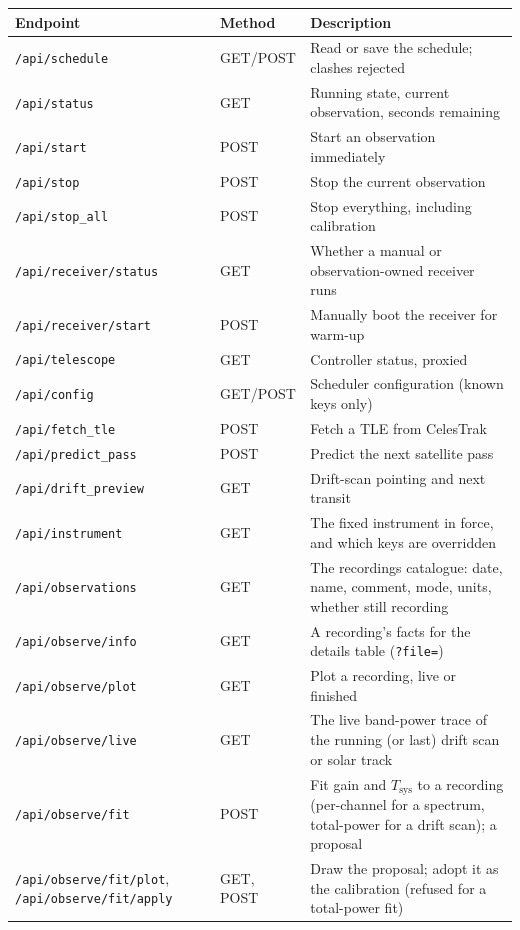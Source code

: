 \documentclass[11pt,a4paper]{article}
\begin{document}
\footnotesize
\begin{longtable}{llp{7.6cm}}
\toprule
\textbf{Endpoint} & \textbf{Method} & \textbf{Description} \\
\midrule
\endhead
\texttt{/api/schedule} & GET/POST & Read or save the schedule; clashes rejected \\
\texttt{/api/status} & GET & Running state, current observation, seconds remaining \\
\texttt{/api/start} & POST & Start an observation immediately \\
\texttt{/api/stop} & POST & Stop the current observation \\
\texttt{/api/stop\_all} & POST & Stop everything, including calibration \\
\texttt{/api/receiver/status} & GET & Whether a manual or observation-owned receiver runs \\
\texttt{/api/receiver/start} & POST & Manually boot the receiver for warm-up \\
\texttt{/api/telescope} & GET & Controller status, proxied \\
\texttt{/api/config} & GET/POST & Scheduler configuration (known keys only) \\
\texttt{/api/fetch\_tle} & POST & Fetch a TLE from CelesTrak \\
\texttt{/api/predict\_pass} & POST & Predict the next satellite pass \\
\texttt{/api/drift\_preview} & GET & Drift-scan pointing and next transit \\
\texttt{/api/instrument} & GET & The fixed instrument in force, and which keys are overridden \\
\texttt{/api/observations} & GET & The recordings catalogue: date, name, comment, mode, units, whether still recording \\
\texttt{/api/observe/info} & GET & A recording's facts for the details table (\texttt{?file=}) \\
\texttt{/api/observe/plot} & GET & Plot a recording, live or finished \\
\texttt{/api/observe/live} & GET & The live band-power trace of the running (or last) drift scan or solar track \\
\texttt{/api/observe/fit} & POST & Fit gain and $T_\text{sys}$ to a recording (per-channel for a spectrum, total-power for a drift scan); a proposal \\
\texttt{/api/observe/fit/plot}, \texttt{/api/observe/fit/apply} & GET, POST & Draw the proposal; adopt it as the calibration (refused for a total-power fit) \\

\end{longtable}
\end{document}
